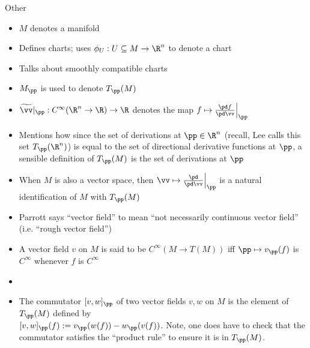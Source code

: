 Other

\begin{itemize}
	\item $M$ denotes a manifold
	\item Defines charts; uses $\phi_U:U \subseteq M \rightarrow \R^n$ to denote a chart
	\item Talks about smoothly compatible charts 
	\item $M_\pp$ is used to denote $T_\pp(M)$
	\item $\widetilde{\vv}|_\pp:C^\infty(\R^n \rightarrow \R) \rightarrow \R$ denotes the map $f \mapsto \frac{\pd f}{\pd \vv}\Big|_\pp$
	\item Mentions how since the set of derivations at $\pp \in \R^n$ (recall, Lee calls this set $T_\pp(\R^n)$) is equal to the set of directional derivative functions at $\pp$, a sensible definition of $T_\pp(M)$ is the set of derivations at $\pp$
	\item When $M$ is also a vector space, then $\vv \mapsto \frac{\pd}{\pd \vv}\Big|_\pp$ is a natural identification of $M$ with $T_\pp(M)$
	\item Parrott says ``vector field'' to mean ``not necessarily continuous vector field'' (i.e. ``rough vector field'')
	\item A vector field $v$ on $M$ is said to be $C^\infty(M \rightarrow T(M))$ iff $\pp \mapsto v_\pp(f)$ is $C^\infty$ whenever $f$ is $C^\infty$ 
	\item 
	\item The commutator $[v, w]_\pp$ of two vector fields $v, w$ on $M$ is the element of $T_\pp(M)$ defined by \\ ${[v, w]_\pp(f) := v_\pp(w(f)) - w_\pp(v(f))}$. Note, one does have to check that the commutator satisfies the ``product rule'' to ensure it is in $T_\pp(M)$.
\end{itemize}
